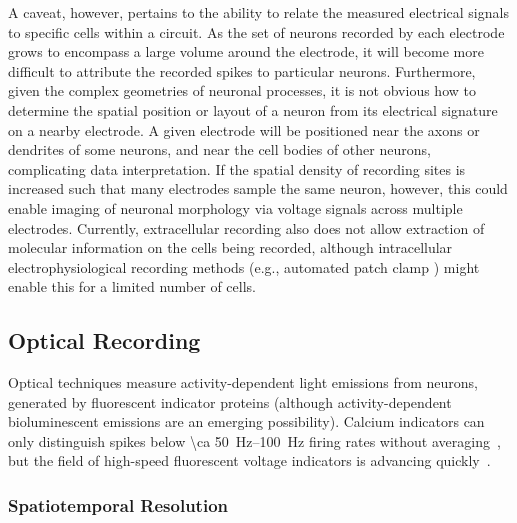 A caveat, however, pertains to the ability to relate the measured electrical signals to specific cells within a circuit.
As the set of neurons recorded by each electrode grows to encompass a large volume around the electrode, it will become more difficult to attribute the recorded spikes to particular neurons.
Furthermore, given the complex geometries of neuronal processes, it is not obvious how to determine the spatial position or layout of a neuron from its electrical signature on a nearby electrode. A given electrode will be positioned near the axons or dendrites of some neurons, and near the cell bodies of other neurons, complicating data interpretation. If the spatial density of recording sites is increased such that many electrodes sample the same neuron, however, this could enable imaging of neuronal morphology via voltage signals across multiple electrodes. Currently, extracellular recording also does not allow extraction of molecular information on the cells being recorded, although intracellular electrophysiological recording methods (e.g., automated patch clamp \cite{Kodandaramaiah2012}) might enable this for a limited number of cells.

\subsection{Optical Recording}

Optical techniques measure activity-dependent light emissions from neurons, generated by fluorescent indicator proteins (although activity-dependent bioluminescent emissions are an emerging possibility).
Calcium indicators can only distinguish spikes below \SIrange{\ca 50}{100}{\hertz} firing rates without averaging~\cite{Smetters99}, but the field of high-speed fluorescent voltage indicators is advancing quickly~\cite{Barnett2012, Kralj2012, Storace2013}.

\subsubsection{Spatiotemporal Resolution}

